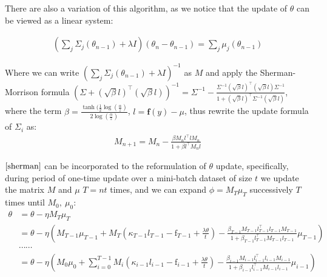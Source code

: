 \documentclass{article}
\begin{document}
There are also a variation of this algorithm, as we notice that the update of $\theta$ can be viewed as a linear system:

\begin{equation}
  \begin{aligned}
    (\sum_j \Sigma_{j}(\theta_{n-1}) + \lambda I) (\theta_n - \theta_{n-1}) = \sum_{j} \mu_j(\theta_{n-1})
  \end{aligned}
 \end{equation} 

 Where we can write $(\sum_j \Sigma_{j}(\theta_{n-1}) + \lambda I)^{-1}$ as $M$ and apply the Sherman-Morrison formula $(\Sigma + (\sqrt{\beta}l)^{\top}(\sqrt{\beta}l))^{-1} = \Sigma^{-1} - \frac{\Sigma^{-1} (\sqrt{\beta}l)^{\top}(\sqrt{\beta}l)\Sigma^{-1}}{1 + (\sqrt{\beta}l)^{\top} \Sigma^{-1} (\sqrt{\beta}l)}$,
 where the term $\beta = \frac{\tanh(\frac{1}{2}\log(\frac{\alpha}{z})}{2\log(\frac{\alpha}{z})}$, $l = \textbf{f}(y) - \mu$, thus rewrite the update formula of $\Sigma_i$ as:
 \begin{equation}
  \begin{aligned}
    M_{n+1} = M_{n} - \frac{\beta M_n l^{\top} l M_n}{1 + \beta l^{\top} M_n l}
  \end{aligned}
  \label{sherman}
 \end{equation} 

 $\ref{sherman}$ can be incorporated to the reformulation of $\theta$ update, specifically, during period of one-time update over a mini-batch dataset of size $t$ we update the matrix $M$ and $\mu$ $T = nt$ times, and we can expand
 $\phi = M_{T} \mu_{T}$ successively $T$ times until $M_0,\ \mu_0$:
 \begin{equation}
  \begin{aligned}
    \theta & = \theta - \eta M_T \mu_T \nonumber \\
    & = \theta - \eta ( M_{T-1} \mu_{T-1} + M_{T}(\kappa_{T-1} l_{T-1} - \text{f}_{T-1} + \frac{\lambda \theta}{t})  - \frac{\beta_{T-1} M_{T-1} l_{T-1}^{\top} l_{T-1} M_{T-1}}{1 + \beta_{T-1} l_{T-1}^{\top} M_{T-1} l_{T-1}} \mu_{T-1} ) \\
    & \cdots \cdots \\
    & = \theta - \eta(M_0 \mu_0 + \sum_{i=0}^{T-1} M_{i}(\kappa_{i-1} l_{i-1} - \text{f}_{i-1} + \frac{\lambda \theta}{t}) - \frac{\beta_{i-1} M_{i-1} l_{i-1}^{\top} l_{i-1} M_{i-1}}{1 + \beta_{i-1} l_{i-1}^{\top} M_{i-1} l_{i-1}} \mu_{i-1} ) 
  \end{aligned}
  \label{shermanupdate}
 \end{equation} 
\end{document}
